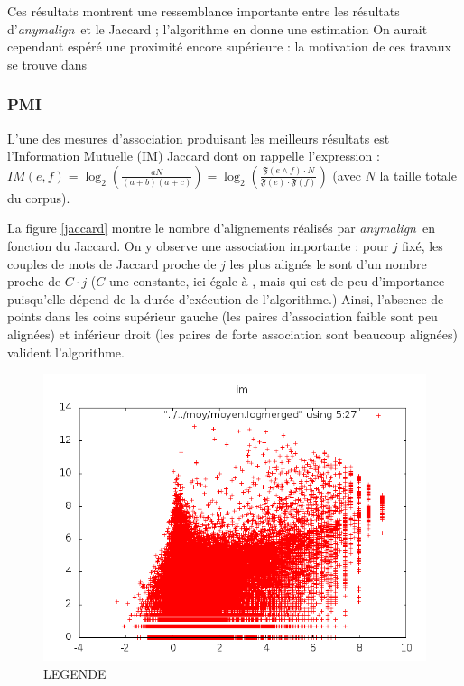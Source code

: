 \documentclass[a4paper,10pt]{article}
\newcommand{\anym}{\emph{anymalign}}
\begin{document}
Ces résultats montrent une ressemblance importante entre les résultats d'\anym~et le Jaccard ; l'algorithme en donne une estimation
On aurait cependant espéré une proximité encore supérieure : la motivation de ces travaux se trouve dans %


\subsubsection{PMI}

L'une des mesures d'association produisant les meilleurs résultats est l'Information Mutuelle (IM) %
 Jaccard dont on rappelle l'expression : $IM(e,f)=\log_2\left(\frac{aN}{(a+b)(a+c)}\right)=\log_2\left(\frac{\mathfrak{F}(e\wedge f)\cdot N}{\mathfrak{F}(e)\cdot\mathfrak{F}(f)}\right)$ (avec $N$ la taille totale du corpus).

La figure \ref{jaccard} montre le nombre d'alignements %
 réalisés par \anym~en fonction du Jaccard. On y observe une association importante : 
pour $j$ fixé, les couples de mots de Jaccard proche de $j$ les plus alignés le sont d'un nombre proche de $C\cdot j$ ($C$ une constante, ici égale à %
, mais qui est de peu d'importance puisqu'elle dépend de la durée d'exécution de l'algorithme.) Ainsi, l'absence de points dans les coins supérieur gauche (les paires d'association faible sont peu alignées) et inférieur droit (les paires de forte association sont beaucoup alignées) valident l'algorithme.

\begin{figure}[t]
\centering
\label{im}
\includegraphics[width=12cm]{imlog.png} %
\caption{LEGENDE} %
\end{figure}
\end{document}
